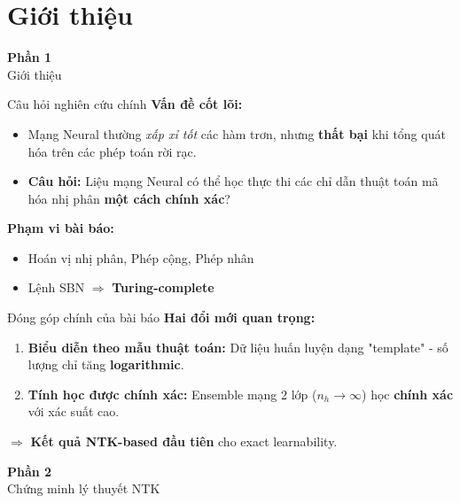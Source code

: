 
\section{Giới thiệu}

\begin{frame}{}
  \centering
  \vfill
  {\Huge \textbf{Phần 1}}\\[0.5cm]
  {\Large Giới thiệu}
  \vfill
\end{frame}

\begin{frame}{Câu hỏi nghiên cứu chính}
  \textbf{Vấn đề cốt lõi:}
  \begin{itemize}
    \item Mạng Neural thường \emph{xấp xỉ tốt} các hàm trơn, nhưng \textbf{thất bại} khi tổng quát hóa trên các phép toán rời rạc.
    \item \textbf{Câu hỏi:} Liệu mạng Neural có thể học thực thi các chỉ dẫn thuật toán mã hóa nhị phân \textbf{một cách chính xác}?
  \end{itemize}

  \vspace{0.3cm}
  \textbf{Phạm vi bài báo:}
  \begin{itemize}
    \item Hoán vị nhị phân, Phép cộng, Phép nhân
    \item Lệnh SBN $\Rightarrow$ \textbf{Turing-complete}
  \end{itemize}
\end{frame}

\begin{frame}{Đóng góp chính của bài báo}
  \textbf{Hai đổi mới quan trọng:}
  \begin{enumerate}
    \item \textbf{Biểu diễn theo mẫu thuật toán:} Dữ liệu huấn luyện dạng "template" - số lượng chỉ tăng \textbf{logarithmic}.
    \item \textbf{Tính học được chính xác:} Ensemble mạng 2 lớp ($n_h \to \infty$) học \textbf{chính xác} với xác suất cao.
  \end{enumerate}
  
  \vspace{0.3cm}
  $\Rightarrow$ \textbf{Kết quả NTK-based đầu tiên} cho exact learnability.
\end{frame}

\begin{frame}{}
  \centering
  \vfill
  {\Huge \textbf{Phần 2}}\\[0.5cm]
  {\Large Chứng minh lý thuyết NTK}
  \vfill
\end{frame}
